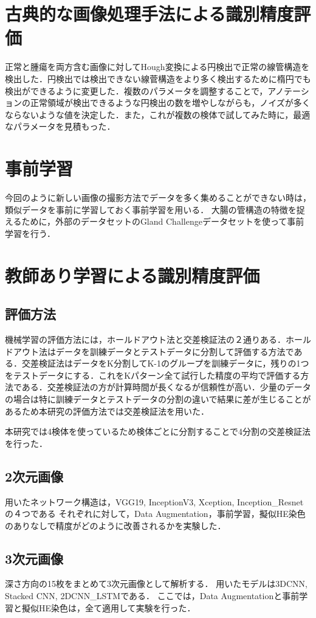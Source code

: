 \section{古典的な画像処理手法による識別精度評価}
正常と腫瘍を両方含む画像に対してHough変換による円検出で正常の線管構造を検出した．円検出では検出できない線菅構造をより多く検出するために楕円でも検出ができるように変更した．複数のパラメータを調整することで，アノテーションの正常領域が検出できるような円検出の数を増やしながらも，ノイズが多くならないような値を決定した．また，これが複数の検体で試してみた時に，最適なパラメータを見積もった．

\section{事前学習}
今回のように新しい画像の撮影方法でデータを多く集めることができない時は，類似データを事前に学習しておく事前学習を用いる．
大腸の管構造の特徴を捉えるために，外部のデータセットのGland Challengeデータセットを使って事前学習を行う．

\section{教師あり学習による識別精度評価}

\subsection{評価方法}
機械学習の評価方法には，ホールドアウト法と交差検証法の２通りある．ホールドアウト法はデータを訓練データとテストデータに分割して評価する方法である．交差検証法はデータをK分割してK-1のグループを訓練データに，残りの1つをテストデータにする．これをKパターン全て試行した精度の平均で評価する方法である．交差検証法の方が計算時間が長くなるが信頼性が高い．少量のデータの場合は特に訓練データとテストデータの分割の違いで結果に差が生じることがあるため本研究の評価方法では交差検証法を用いた．

本研究では4検体を使っているため検体ごとに分割することで4分割の交差検証法を行った．

\subsection*{2次元画像}
用いたネットワーク構造は，VGG19, InceptionV3, Xception, Inception\_Resnetの４つである
それぞれに対して，Data Augmentation，事前学習，擬似HE染色のありなしで精度がどのように改善されるかを実験した．

\subsection*{3次元画像}
深さ方向の15枚をまとめて3次元画像として解析する．
用いたモデルは3DCNN, Stacked CNN, 2DCNN\_LSTMである．
ここでは，Data Augmentationと事前学習と擬似HE染色は，全て適用して実験を行った．

